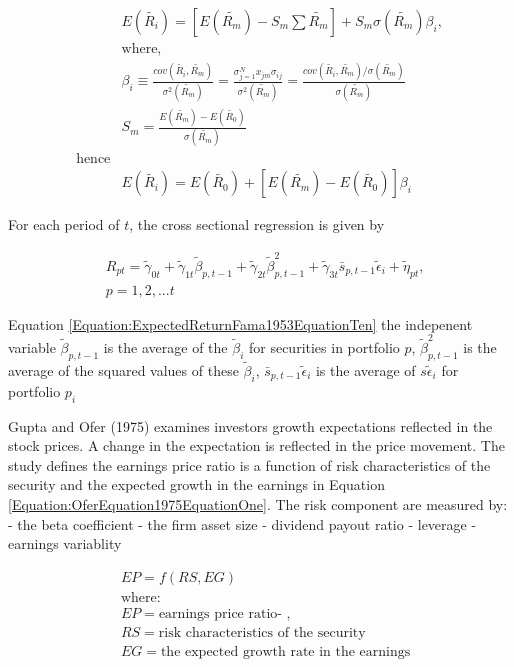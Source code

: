 \documentclass[
  letterpaper,
  DIV=11,
  numbers=noendperiod]{scrreprt}
\begin{document}
\begin{align}
    &E(\tilde{R_i}) = \left[E(\tilde{R_m}) -S_m \sum\tilde{R_m}  \right] + S_m \sigma (\tilde{R_m}) \beta_i, \nonumber \\
    &\text{where}, \nonumber \\ 
    &\beta_i \equiv \frac{cov(\tilde{R_i}, \tilde{R_m})}{\sigma^2(\tilde{R_m})} = \frac{\sigma_{j=1}^{N} x_{jm}\sigma_{ij}}{\sigma^2 (\tilde{R_m})}=\frac{cov(\tilde{R_i},\tilde{R_m})/\sigma(\tilde{R_m})}{\sigma (\tilde{R_m})} \nonumber \\
    &S_m=\frac{E(\tilde{R_m})-E(\tilde{R_0})}{\sigma (\tilde{R_m})}  \nonumber\\
    \text{hence} \nonumber \\
    &E(\tilde{R_i}) = E(\tilde{R_0}) + \left[ E(\tilde{R_m}) - E(\tilde{R_0}) \right] \beta_i
\end{align}
\label{Equation:ExpectedReturnFama1953}

For each period of \(t\), the cross sectional regression is given by

\begin{align}
    & R_{pt} = \tilde{\gamma}_{0t} + \tilde{\gamma}_{1t} \tilde{\beta}_{p,t-1}+\tilde{\gamma}_{2t} \tilde{\beta}_{p,t-1}^{2} + \tilde{\gamma}_{3t} \bar{s}_{p, t-1} \tilde{\epsilon}_{i}+\tilde{\eta}_{pt}, \\
    &p=1,2,...t \nonumber
\end{align}
\label{Equation:ExpectedReturnFama1953EquationTen}

Equation \ref{Equation:ExpectedReturnFama1953EquationTen} the indepenent
variable \(\tilde{\beta}_{p,t-1}\) is the average of the
\(\tilde{\beta}_i\) for securities in portfolio \(p\),
\(\tilde{\beta}_{p,t-1}^2\) is the average of the squared values of
these \(\tilde{\beta}_i\), \(\bar{s}_{p, t-1} \tilde{\epsilon}_{i}\) is
the average of \(s\tilde{\epsilon}_i\) for portfolio \(p_i\)

Gupta and Ofer (1975) examines investors growth expectations reflected
in the stock prices. A change in the expectation is reflected in the
price movement. The study defines the earnings price ratio is a function
of risk characteristics of the security and the expected growth in the
earnings in Equation \ref{Equation:OferEquation1975EquationOne}. The
risk component are measured by: - the beta coefficient - the firm asset
size - dividend payout ratio - leverage - earnings variablity

\begin{align}

&EP = f(RS, EG) \\
&\text{where:} \nonumber \\
& EP = \text{earnings price ratio- }, \nonumber \\
& RS = \text{risk characteristics of the security} \nonumber \\
& EG =\text{the expected growth rate in the earnings} \nonumber \\

\end{align}
\label{Equation:OferEquation1975EquationOne}
\end{document}
